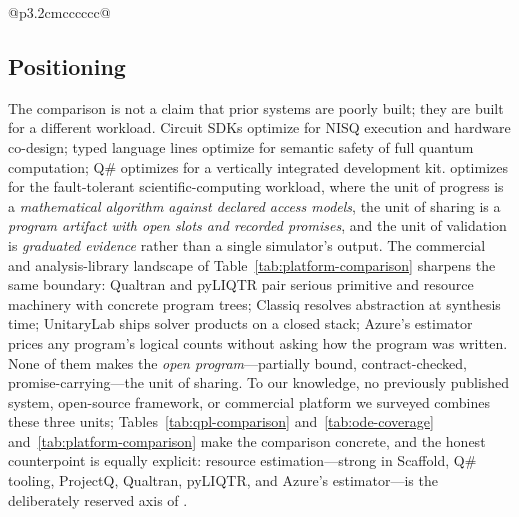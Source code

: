 \begin{table}[t]
\begin{tabular}{@{}p{3.2cm}cccccc@{}}
    \bottomrule
  \end{tabular}
\end{table}

\subsection{Positioning}
\label{sec:positioning}

The comparison is not a claim that prior systems are poorly built; they are
built for a different workload.  Circuit SDKs optimize for NISQ execution
and hardware co-design; typed language lines optimize for semantic safety
of full quantum computation; Q\# optimizes for a vertically integrated
development kit.  \pqlang{} optimizes for the fault-tolerant
scientific-computing workload, where the unit of progress is a
\emph{mathematical algorithm against declared access models}, the unit of
sharing is a \emph{program artifact with open slots and recorded promises},
and the unit of validation is \emph{graduated evidence} rather than a single
simulator's output.  The commercial and analysis-library landscape of
Table~\ref{tab:platform-comparison} sharpens the same boundary: Qualtran
and pyLIQTR pair serious primitive and resource machinery with concrete
program trees; Classiq resolves abstraction at synthesis time;
UnitaryLab ships solver products on a closed stack; Azure's estimator
prices any program's logical counts without asking how the program was
written.  None of them makes the \emph{open program}---partially bound,
contract-checked, promise-carrying---the unit of sharing.  To our
knowledge, no previously published system, open-source framework, or
commercial platform we surveyed combines these three units;
Tables~\ref{tab:qpl-comparison} and~\ref{tab:ode-coverage}
and~\ref{tab:platform-comparison} make the comparison concrete, and the honest
counterpoint is equally explicit: resource estimation---strong in Scaffold,
Q\# tooling, ProjectQ, Qualtran, pyLIQTR, and Azure's estimator---is the
deliberately reserved axis of
.
